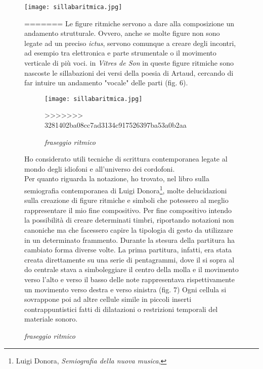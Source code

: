 
\begin{figure}[htbp]
\begin{center}
\texttt{[image: sillabaritmica.jpg]}
\caption{default}
\label{default}
\end{center}
=======
Le figure ritmiche servono a dare alla composizione un andamento strutturale. Ovvero, anche se molte figure non sono legate ad un preciso \textit{ictus}, servono comunque a creare degli incontri, ad esempio tra elettronica e parte strumentale o il movimento verticale di più voci. in \textit{Vitres de Son} in queste figure ritmiche sono nascoste le sillabazioni dei versi della poesia di Artaud, cercando di far intuire un andamento "vocale" delle parti (fig. 6). \\
 \begin{figure}[htbp]
        \centering
        \texttt{[image: sillabaritmica.jpg]}
          \small{\caption{\textit{fraseggio ritmico}}}
>>>>>>> 3281402ba08cc7ad3134c917526397ba53a0b2aa
\end{figure}

Ho considerato utili tecniche di scrittura contemporanea legate al mondo degli idiofoni e all'universo dei cordofoni. \\
Per quanto riguarda la notazione, ho trovato, nel libro sulla semiografia contemporanea di Luigi Donora\footnote{Luigi Donora, \textit{Semiografia della nuova musica}, }, molte delucidazioni sulla creazione di figure ritmiche e simboli che potessero al meglio rappresentare il mio fine compositivo. Per fine compositivo intendo la possibilità di creare determinati timbri, riportando notazioni non canoniche ma che facessero capire la tipologia di gesto da utilizzare in un determinato frammento. Durante la stesura della partitura ha cambiato forma diverse volte. La prima partitura, infatti, era stata creata direttamente su una serie di pentagrammi, dove il si sopra al do centrale stava a simboleggiare il centro della molla e il movimento verso l'alto e verso il basso delle note rappresentava rispettivamente un movimento verso destra e verso sinistra (fig. 7)
Ogni cellula si sovrappone poi ad altre cellule simile in piccoli inserti contrappuntistici fatti di dilatazioni o restrizioni temporali del materiale sonoro.


\end{figure}
